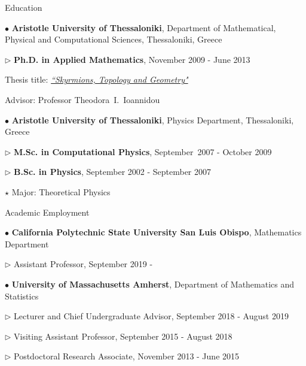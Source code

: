 \documentclass[10pt]{article} %
\newenvironment{outerlist}[1][\enskip\textbullet]%
        {\begin{itemize}[#1]}{\end{itemize}%
         \vspace{-.6\baselineskip}}
\newenvironment{innerlist}[1][\enskip\textbullet]%
        {\begin{compactitem}[#1]}{\end{compactitem}}
\begin{document}
\begin{section}{Education}
\vspace{-6.9mm} 
\begin{outerlist}
\item[$\bullet$] \textbf{Aristotle University of Thessaloniki}, Department of Mathematical, 
Physical and Computational Sciences, Thessaloniki, Greece
\begin{innerlist}
\item[$\triangleright$] \textbf{Ph.D. in Applied Mathematics}, November 2009 - June 2013 
\item[] Thesis title: \href{http://phdtheses.ekt.gr/eadd/handle/10442/29355}{\emph{``Skyrmions, Topology and Geometry"}}
\item[] Advisor: Professor Theodora~I.~Ioannidou
\end{innerlist}
\item[$\bullet$] \textbf{Aristotle University of Thessaloniki}, Physics Department, Thessaloniki, Greece
\begin{innerlist}
\item[$\triangleright$] \textbf{M.Sc. in Computational Physics}, September~2007 - October 2009
\item[$\triangleright$] \textbf{B.Sc. in Physics}, September 2002 - September 2007
\begin{innerlist}
\item[$\star$] Major: Theoretical Physics
\end{innerlist}
\end{innerlist}
\end{outerlist}

\end{section}

\begin{section}{Academic Employment}
\vspace{-6.9mm}
\begin{outerlist}
\item[$\bullet$]
\textbf{California Polytechnic State University San Luis Obispo}, Mathematics Department
\begin{innerlist}
\item [$\triangleright$] Assistant Professor, September 2019 -
\end{innerlist}
\item[$\bullet$]
\textbf{University of Massachusetts Amherst}, Department of 
Mathematics and Statistics
\begin{innerlist}
\item [$\triangleright$] Lecturer and Chief Undergraduate Advisor, September 2018 - August 2019
\item [$\triangleright$] Visiting Assistant Professor, September 2015 - August 2018
\item [$\triangleright$] Postdoctoral Research Associate, November 2013 - June 2015
\end{innerlist}

\end{outerlist}
\end{section}
\end{document}
